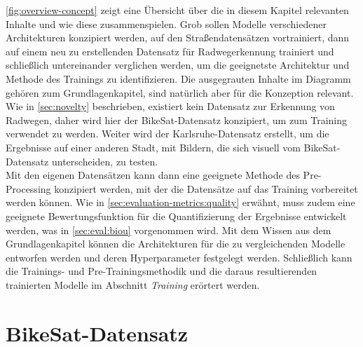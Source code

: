 \autoref{fig:overview-concept} zeigt eine Übersicht über die in diesem Kapitel relevanten Inhalte und wie diese 
zusammenspielen. Grob sollen Modelle verschiedener Architekturen 
konzipiert werden, auf den Straßendatensätzen vortrainiert, dann auf einem neu zu erstellenden Datensatz für Radwegerkennung 
trainiert und schließlich untereinander verglichen werden, um die geeignetste Architektur und Methode des Trainings zu identifizieren. 
Die ausgegrauten Inhalte im Diagramm gehören zum Grundlagenkapitel, sind natürlich aber für die Konzeption relevant. \\ 
Wie in \autoref{sec:novelty} beschrieben, existiert kein Datensatz zur Erkennung von Radwegen, daher wird hier 
der BikeSat-Datensatz konzipiert, um zum Training verwendet zu werden. Weiter wird der Karlsruhe-Datensatz 
erstellt, um die Ergebnisse auf einer anderen Stadt, mit Bildern, die sich visuell vom BikeSat-Datensatz unterscheiden, zu testen. \\
Mit den eigenen Datensätzen kann dann eine geeignete Methode des Pre-Processing konzipiert werden, mit der die Datensätze 
auf das Training vorbereitet werden können. Wie in \autoref{sec:evaluation-metrics:quality} erwähnt, muss zudem 
eine geeignete Bewertungsfunktion für die Quantifizierung der Ergebnisse entwickelt werden, was in \autoref{sec:eval:biou} 
vorgenommen wird. Mit dem Wissen aus dem Grundlagenkapitel können die Architekturen für die zu vergleichenden Modelle entworfen werden 
und deren Hyperparameter festgelegt werden. Schließlich kann die Trainings- und Pre-Trainingsmethodik und die daraus resultierenden 
trainierten Modelle im Abschnitt \textit{Training} erörtert werden.  

\section{BikeSat-Datensatz} \label{sec:bike-data}

